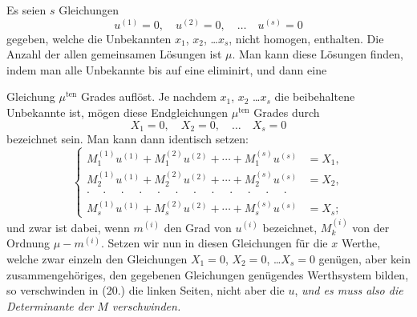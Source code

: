 \documentclass{article}
\begin{document}
Es seien $s$ Gleichungen
\[
u^{(1)}=0, \quad u^{(2)}=0, \quad \ldots \quad u^{(s)}=0
\]
gegeben, welche die Unbekannten $x_{1}$, $x_{2}$, \ldots $x_{s}$, nicht homogen, enthalten. Die Anzahl der allen gemeinsamen Lösungen ist $\mu$. Man kann diese Lösungen finden, indem man alle Unbekannte bis auf eine eliminirt, und dann eine

Gleichung $\mu^{\text{ten}}$ Grades auflöst. Je nachdem $x_{1}$, $x_{2}$ \ldots $x_{s}$ die beibehaltene Unbekannte ist, mögen diese Endgleichungen $\mu^{\text{ten}}$ Grades durch
\[
X_{1}=0, \quad X_{2}=0, \quad \ldots \quad X_{s}=0
\]
bezeichnet sein. Man kann dann identisch setzen:
\[
\left\{
\begin{aligned}
M_{1}^{(1)}u^{(1)}+M_{1}^{(2)}u^{(2)}+\cdots+M_{1}^{(s)}u^{(s)} &= X_{1},\\
M_{2}^{(1)}u^{(1)}+M_{2}^{(2)}u^{(2)}+\cdots+M_{2}^{(s)}u^{(s)} &= X_{2},\\
\cdot\quad\cdot\quad\cdot\quad\cdot\quad\cdot\quad\cdot\quad\cdot\quad\cdot\quad\cdot\quad\cdot\quad\cdot\quad\cdot & \\
M_{s}^{(1)}u^{(1)}+M_{s}^{(2)}u^{(2)}+\cdots+M_{s}^{(s)}u^{(s)} &= X_{s};
\end{aligned}
\right. \tag{20.}
\]
und zwar ist dabei, wenn $m^{(i)}$ den Grad von $u^{(i)}$ bezeichnet, $M_{k}^{(i)}$ von der Ordnung $\mu-m^{(i)}$. Setzen wir nun in diesen Gleichungen für die $x$ Werthe, welche zwar einzeln den Gleichungen $X_{1}=0$, $X_{2}=0$, \ldots $X_{s}=0$ genügen, aber kein zusammengehöriges, den gegebenen Gleichungen genügendes Werthsystem bilden, so verschwinden in (20.) die linken Seiten, nicht aber die $u$, \emph{und es muss also die Determinante der $M$ verschwinden.}
\end{document}
